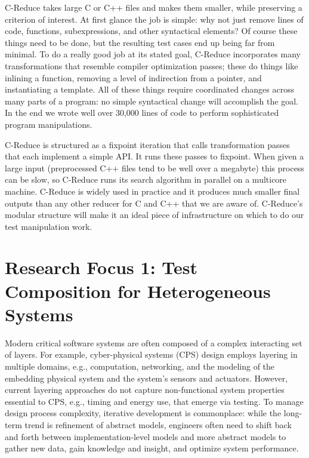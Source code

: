 {C-Reduce\cite{CReduce} takes large C or C++ files and makes them
smaller, while preserving a criterion of interest.
%
At first glance the job is simple: why not just remove lines of code,
functions, subexpressions, and other syntactical elements?
%
Of course these things need to be done, but the resulting test cases
end up being far from minimal.
%
To do a really good job at its stated goal, C-Reduce incorporates many
transformations that resemble compiler optimization passes; these do
things like inlining a function, removing a level of indirection from
a pointer, and instantiating a template.
%
All of these things require coordinated changes across many parts of a
program: no simple syntactical change will accomplish the goal.
%
In the end we wrote well over 30,000 lines of code to perform
sophisticated program manipulations.


C-Reduce is structured as a fixpoint iteration that calls
transformation passes that each implement a simple API\@.
%
It runs these passes to fixpoint.
%
When given a large input (preprocessed C++ files tend to be well over
a megabyte) this process can be slow, so C-Reduce runs its search
algorithm in parallel on a multicore machine.
%
C-Reduce is widely used in practice and it produces much smaller final
outputs than any other reducer for C and C++ that we are aware of.
%
C-Reduce's modular structure will make it an ideal piece of
infrastructure on which to do our test manipulation work.
}

\section{Research Focus 1: Test Composition for Heterogeneous Systems}

Modern critical software systems are often composed of a complex
interacting set of layers.  For example,
cyber-physical systems (CPS) design employs layering in multiple
domains, e.g., computation, networking, and the modeling of the
embedding physical system and the system's sensors and
actuators. However, current layering approaches do not capture
non-functional system properties essential to CPS, e.g., timing and
energy use, that emerge via testing.  To manage design process
complexity, iterative development is commonplace: while the long-term
trend is refinement of abstract models, engineers often need to shift
back and forth  between implementation-level models and more abstract
models to gather new data, gain knowledge and insight, and optimize
system performance.  

